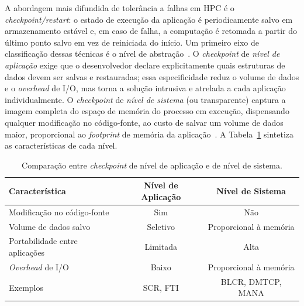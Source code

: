 A abordagem mais difundida de tolerância a falhas em HPC é o
\textit{checkpoint\slash restart}: o
estado de execução da aplicação é periodicamente salvo em armazenamento estável e, em
caso de falha, a computação é retomada a partir do último ponto salvo em vez de
reiniciada do início. Um primeiro eixo de classificação dessas técnicas é o nível de
abstração~\cite{posner2020syslevel}. O \textit{checkpoint} de \textit{nível de aplicação} exige
que o desenvolvedor declare explicitamente quais estruturas de dados devem ser salvas e
restauradas; essa especificidade reduz o volume de dados e o \textit{overhead} de I/O, mas torna
a solução intrusiva e atrelada a cada aplicação individualmente. O \textit{checkpoint} de
\textit{nível de sistema} (ou transparente) captura a imagem completa do espaço de
memória do processo em execução, dispensando qualquer modificação no código-fonte, ao
custo de salvar um volume de dados maior, proporcional ao \textit{footprint} de memória
da aplicação~\cite{posner2020syslevel}. A Tabela~\ref{tab:ckpt-comparacao} sintetiza as
características de cada nível.

\begin{table}[htb]
  \centering
  \caption{Comparação entre \textit{checkpoint} de nível de aplicação e de nível de sistema.}
  \label{tab:ckpt-comparacao}
  \begin{tabular}{lcc}
    \toprule
    \textbf{Característica} & \textbf{Nível de Aplicação} & \textbf{Nível de Sistema} \\
    \midrule
    Modificação no código-fonte  & Sim         & Não \\
    Volume de dados salvo        & Seletivo    & Proporcional à memória \\
    Portabilidade entre aplicações & Limitada  & Alta \\
    \textit{Overhead} de I/O & Baixo       & Proporcional à memória \\
    Exemplos                     & SCR, FTI   & BLCR, DMTCP, MANA \\
    \bottomrule
  \end{tabular}
\end{table}

